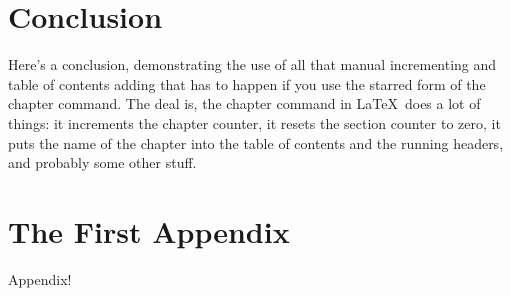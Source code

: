 \documentclass[12pt,draft]{reedthesis}
\theoremstyle{plain}
\theoremstyle{definition}
\begin{document}
\chapter*{Conclusion}

Here's a conclusion, demonstrating the use of all that manual incrementing and table of contents adding that has to happen if you use the starred form of the chapter command. The deal is, the chapter command in \LaTeX\ does a lot of things: it increments the chapter counter, it resets the section counter to zero, it puts the name of the chapter into the table of contents and the running headers, and probably some other stuff. 


\appendix
\chapter{The First Appendix}

Appendix!


\backmatter%

\nocite{*}


\end{document}
